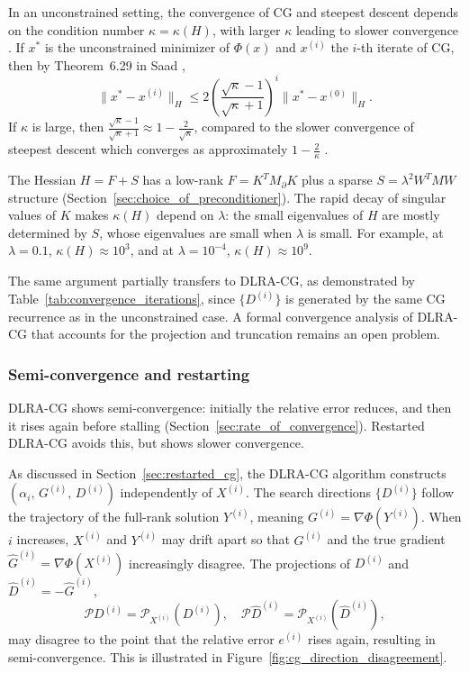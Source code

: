 In an unconstrained setting, the convergence of CG and steepest descent depends on the condition number $\kappa = \kappa(H)$, with larger $\kappa$ leading to slower convergence \cite{saadIterativeMethodsSparse2003}. If $x^*$ is the unconstrained minimizer of $\Phi(x)$ and $x^{(i)}$ the $i$-th iterate of CG, then by Theorem~6.29 in Saad \cite{saadIterativeMethodsSparse2003},
\begin{equation}\label{eq:convergence_of_CG}
    \| x^* - x^{(i)} \|_H \le 2 \left(
        \frac{\sqrt{\kappa} - 1}{\sqrt{\kappa} + 1}
    \right)^i
    \| x^* - x^{(0)} \|_H.
\end{equation}
If $\kappa$ is large, then $\tfrac{\sqrt{\kappa} - 1}{\sqrt{\kappa} + 1} \approx 1 - \tfrac{2}{\sqrt{\kappa}}$, compared to the slower convergence of steepest descent which converges as approximately $1 - \tfrac{2}{\kappa}$ \cite{saadIterativeMethodsSparse2003}.

The Hessian $H = F + S$ has a low-rank $F = K^T M_\partial K$ plus a sparse $S = \lambda^2 W^T M W$ structure (Section~\ref{sec:choice_of_preconditioner}). The rapid decay of singular values of $K$ makes $\kappa(H)$ depend on $\lambda$: the small eigenvalues of $H$ are mostly determined by $S$, whose eigenvalues are small when $\lambda$ is small. For example, at $\lambda = 0.1$, $\kappa(H) \approx 10^3$, and at  $\lambda = 10^{-4}$, $\kappa(H) \approx 10^9$.

The same argument partially transfers to DLRA-CG, as demonstrated by Table~\ref{tab:convergence_iterations}, since $\{D^{(i)}\}$ is generated by the same CG recurrence as in the unconstrained case. A formal convergence analysis of DLRA-CG that accounts for the projection and truncation remains an open problem.


\subsubsection{Semi-convergence and restarting}

DLRA-CG shows semi-convergence: initially the relative error reduces, and then it rises again before stalling (Section~\ref{sec:rate_of_convergence}). Restarted DLRA-CG avoids this, but shows slower convergence.

As discussed in Section~\ref{sec:restarted_cg}, the DLRA-CG algorithm constructs $(\alpha_i,\, G^{(i)},\, D^{(i)})$ independently of $X^{(i)}$. The search directions $\{D^{(i)}\}$ follow the trajectory of the full-rank solution $Y^{(i)}$, meaning $G^{(i)} = \nabla \Phi(Y^{(i)})$. When $i$ increases, $X^{(i)}$ and $Y^{(i)}$ may drift apart so that $G^{(i)}$ and the true gradient $\hat G^{(i)} = \nabla \Phi(X^{(i)})$ increasingly disagree. The projections of $D^{(i)}$ and $\hat D^{(i)} = -\hat G^{(i)}$,
\begin{equation*}
    \mathcal{P} D^{(i)}
    = \mathcal{P}_{X^{(i)}}(D^{(i)}),\quad
    \mathcal{P} \hat D^{(i)}
    = \mathcal{P}_{X^{(i)}}(\hat D^{(i)}),
\end{equation*}
may disagree to the point that the relative error $e^{(i)}$ rises again, resulting in semi-convergence. This is illustrated in Figure~\ref{fig:cg_direction_disagreement}.

